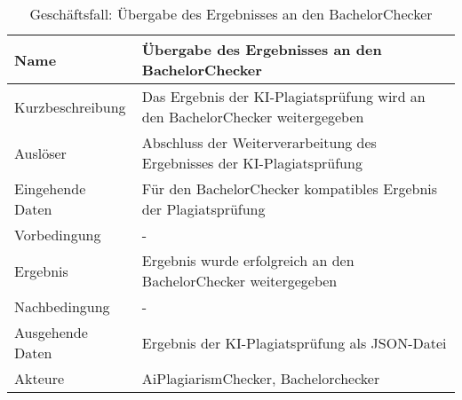 \begin{table}[H]
    \begin{tabularx}{\textwidth}{|l|X|}
        \hline
        \textbf{Name}    & \textbf{Übergabe des Ergebnisses an den BachelorChecker}                      \\
        \hline
        Kurzbeschreibung & Das Ergebnis der KI-Plagiatsprüfung wird an den BachelorChecker weitergegeben \\
        \hline
        Auslöser         & Abschluss der Weiterverarbeitung des Ergebnisses der KI-Plagiatsprüfung       \\
        \hline
        Eingehende Daten & Für den BachelorChecker kompatibles Ergebnis der Plagiatsprüfung              \\
        \hline
        Vorbedingung     & -                                                                             \\
        \hline
        Ergebnis         & Ergebnis wurde erfolgreich an den BachelorChecker weitergegeben               \\
        \hline
        Nachbedingung    & -                                                                             \\
        \hline
        Ausgehende Daten & Ergebnis der KI-Plagiatsprüfung als JSON-Datei                                \\
        \hline
        Akteure          & AiPlagiarismChecker, Bachelorchecker                                          \\
        \hline
    \end{tabularx}
    \caption{Geschäftsfall: Übergabe des Ergebnisses an den BachelorChecker}
    \label{tab:ubergabe-des-ergebnisses-an-den-bachelorchecker}
\end{table}

